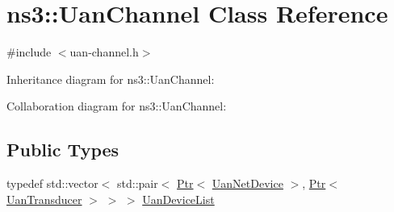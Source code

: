 \hypertarget{classns3_1_1UanChannel}{}\section{ns3\+:\+:Uan\+Channel Class Reference}
\label{classns3_1_1UanChannel}


{\ttfamily \#include $<$uan-\/channel.\+h$>$}



Inheritance diagram for ns3\+:\+:Uan\+Channel\+:


Collaboration diagram for ns3\+:\+:Uan\+Channel\+:
\subsection*{Public Types}
\begin{DoxyCompactItemize}
\item 
typedef std\+::vector$<$ std\+::pair$<$ \hyperlink{classns3_1_1Ptr}{Ptr}$<$ \hyperlink{classns3_1_1UanNetDevice}{Uan\+Net\+Device} $>$, \hyperlink{classns3_1_1Ptr}{Ptr}$<$ \hyperlink{classns3_1_1UanTransducer}{Uan\+Transducer} $>$ $>$ $>$ \hyperlink{classns3_1_1UanChannel_ad0b0e3c9d6f44c7cedfddc6e4d918a99}{Uan\+Device\+List}
\end{DoxyCompactItemize}
